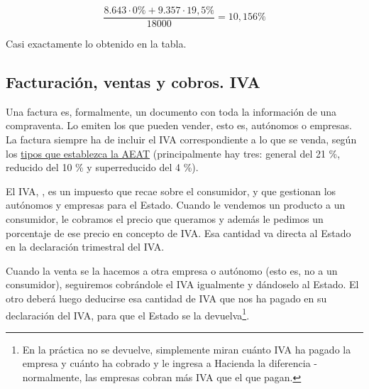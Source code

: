 \documentclass[nochap,palatino,shortheader]{apuntes}
\newcommand{\study}[1]{#1} \newcommand{\substudy}[1]{#1}
\begin{document}
\[
	\frac{8.643·0\% + 9.357·19,5\%}{18000} = 10,156\%
\]

Casi exactamente lo obtenido en la tabla.


\subsection{Facturación, ventas y cobros. IVA}

Una factura es, formalmente, un documento con toda la información de una compraventa. Lo emiten los que pueden vender, esto es, autónomos o empresas. La factura siempre ha de incluir el IVA correspondiente a lo que se venda, según los \href{http://www.agenciatributaria.es/static_files/AEAT/Contenidos_Comunes/La_Agencia_Tributaria/Segmentos_Usuarios/Empresas_y_profesionales/Novedades_IVA_2014/Nuevos_tipos_IVA.pdf}{tipos que establezca la AEAT} (principalmente hay tres: general del 21 \%, reducido del 10 \% y superreducido del 4 \%).

El IVA, , es un impuesto que recae sobre el consumidor, y que gestionan los autónomos y empresas para el Estado. Cuando le vendemos un producto a un consumidor, le cobramos el precio que queramos y además le pedimos un porcentaje de ese precio en concepto de IVA.
Esa cantidad va directa al Estado en la \study{declaración trimestral del IVA}.

Cuando la venta se la hacemos a otra empresa o autónomo (esto es, no a un consumidor), seguiremos cobrándole el IVA igualmente y dándoselo al Estado. El otro deberá luego deducirse esa cantidad de IVA que nos ha pagado en su declaración del IVA, para que el Estado se la devuelva\footnote{En la práctica no se devuelve, simplemente miran cuánto IVA ha pagado la empresa y cuánto ha cobrado y le ingresa a Hacienda la diferencia - normalmente, las empresas cobran más IVA que el que pagan.}.
\end{document}
